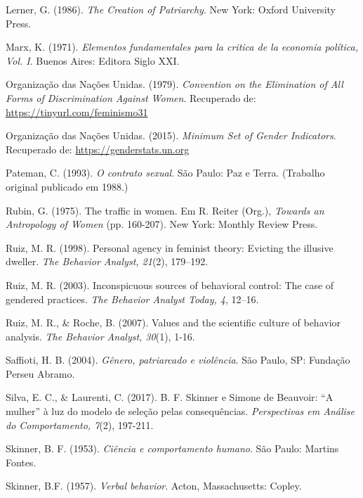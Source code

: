 \hangindent=25pt
\noindent Lerner, G. (1986). \textit{The Creation of Patriarchy}. New York: Oxford University Press.

\hangindent=25pt
\noindent Marx, K. (1971). \textit{Elementos fundamentales para la critica de la economia política, Vol. I}. Buenos Aires: Editora Siglo XXI.

\hangindent=25pt
\noindent Organização das Nações Unidas. (1979). \textit{Convention on the Elimination of All Forms of Discrimination Against Women}. Recuperado de: \url{https://tinyurl.com/feminismo31}

\hangindent=25pt
\noindent Organização das Nações Unidas. (2015). \textit{Minimum Set of Gender Indicators}. Recuperado de: \url{https://genderstats.un.org}

\hangindent=25pt
\noindent Pateman, C. (1993). \textit{O contrato sexual}. São Paulo: Paz e Terra. (Trabalho original publicado em 1988.)

\hangindent=25pt
\noindent Rubin, G. (1975). The traffic in women. Em R. Reiter (Org.), \textit{Towards an Antropology of Women} (pp. 160-207). New York: Monthly Review Press.

\hangindent=25pt
\noindent Ruiz, M. R. (1998). Personal agency in feminist theory: Evicting the illusive dweller. \textit{The Behavior Analyst, 21}(2), 179–192.

\hangindent=25pt
\noindent Ruiz, M. R. (2003). Inconspicuous sources of behavioral control: The case of gendered practices. \textit{The Behavior Analyst Today, 4}, 12–16.

\hangindent=25pt
\noindent Ruiz, M. R., \& Roche, B. (2007). Values and the scientific culture of behavior analysis. \textit{The Behavior Analyst, 30}(1), 1-16.

\hangindent=25pt
\noindent Saffioti, H. B. (2004). \textit{Gênero, patriarcado e violência}. São Paulo, SP: Fundação Perseu Abramo.

\hangindent=25pt
\noindent Silva, E. C., \& Laurenti, C. (2017). B. F. Skinner e Simone de Beauvoir: ``A mulher'' à luz do modelo de seleção pelas consequências. \textit{Perspectivas em Análise do Comportamento, 7}(2), 197-211. 

\hangindent=25pt
\noindent Skinner, B. F. (1953). \textit{Ciência e comportamento humano}. São Paulo: Martins Fontes.

\hangindent=25pt
\noindent Skinner, B.F. (1957). \textit{Verbal behavior}. Acton, Massachusetts: Copley.

